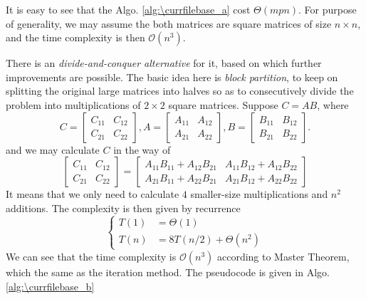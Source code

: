 \documentclass[catalog.tex]{subfiles}
\begin{document}
\begin{Algorithm}[Naive (Iteration)\label{alg:\currfilebase_a}]
    \BlankLine

\end{Algorithm}

It is easy to see that the Algo. \ref{alg:\currfilebase_a} cost $\Theta(mpn)$. For purpose of generality, we may assume the both matrices are square matrices of size $n\times n$, and the time complexity is then $\mathcal{O}(n^3)$.

There is an \textit{divide-and-conquer alternative} for it, based on which further improvements are possible. The basic idea here is \textit{block partition}, to keep on splitting the original large matrices into halves so as to consecutively divide the problem into multiplications of $2\times 2$ square matrices. Suppose $C=AB$, where
$$
C = 
\begin{bmatrix}
    C_{11} & C_{12} \\ 
    C_{21} & C_{22} 
\end{bmatrix}
,A=
\begin{bmatrix}
    A_{11} & A_{12} \\ 
    A_{21} & A_{22} 
    \end{bmatrix}
,B=
\begin{bmatrix}
    B_{11} & B_{12} \\ 
    B_{21} & B_{22} 
\end{bmatrix}
.
$$
and we may calculate $C$ in the way of
$$
\begin{bmatrix}
    C_{11} & C_{12} \\ 
    C_{21} & C_{22} 
\end{bmatrix}
=
\begin{bmatrix}
    A_{11} B_{11}+A_{12} B_{21} & A_{11} B_{12}+A_{12} B_{22} \\
    A_{21} B_{11}+A_{22} B_{21} & A_{21} B_{12}+A_{22} B_{22}
\end{bmatrix}
$$
It means that we only need to calculate $4$ smaller-size multiplications and $n^2$ additions. The complexity is then given by recurrence
$$
\left\lbrace
\begin{aligned}
    T(1) &= \Theta(1) \\
    T(n) &= 8T(n/2) + \Theta(n^2)
\end{aligned}
\right.
$$
We can see that the time complexity is $\mathcal{O}(n^3)$ according to Master Theorem, which the same as the iteration method. The pseudocode is given in Algo. \ref{alg:\currfilebase_b}
\end{document}
